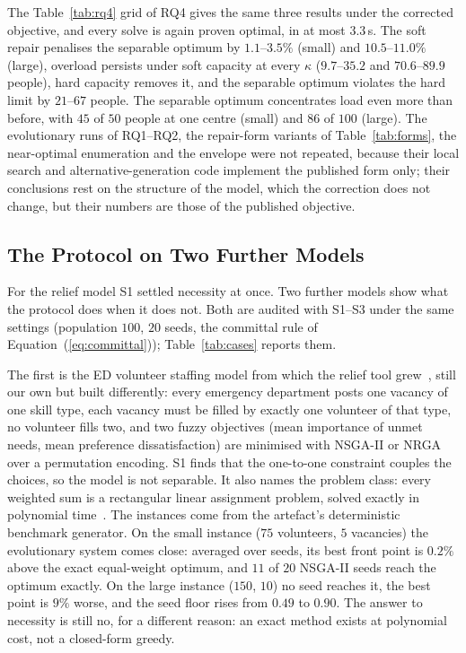 \documentclass[systems,article,accept,moreauthors,pdftex]{Definitions/mdpi}
\begin{document}
The Table~\ref{tab:rq4} grid of RQ4 gives the same three results under the corrected objective,
and every solve is again proven optimal, in at most $3.3$\,s. The soft repair penalises the separable optimum by $1.1$--$3.5\%$ (small) and
$10.5$--$11.0\%$ (large), overload persists under soft capacity at every $\kappa$ ($9.7$--$35.2$
and $70.6$--$89.9$ people), hard capacity removes it, and the separable optimum violates the hard
limit by $21$--$67$ people. The separable optimum concentrates load even more than before, with
$45$ of $50$ people at one centre (small) and $86$ of $100$ (large). The evolutionary runs of
RQ1--RQ2, the repair-form variants of Table~\ref{tab:forms}, the near-optimal enumeration and the envelope were not repeated, because their local
search and alternative-generation code implement the published form only; their conclusions
rest on the structure of the model, which the correction does not change, but their numbers are
those of the published objective.

\subsection{The Protocol on Two Further Models}\label{sec:cases}
For the relief model S1 settled necessity at once. Two further models show what the protocol
does when it does not. Both are audited with S1--S3 under the same settings (population $100$,
$20$ seeds, the committal rule of Equation~(\ref{eq:committal})); Table~\ref{tab:cases} reports them.

The first is the ED volunteer staffing model from which the relief tool
grew~\cite{rabiei2023volunteer}, still our own but built differently: every emergency department
posts one vacancy of one skill type, each vacancy must be filled by exactly one volunteer of that
type, no volunteer fills two, and two fuzzy objectives (mean importance of unmet needs, mean
preference dissatisfaction) are minimised with NSGA-II or NRGA over a permutation encoding. S1
finds that the one-to-one constraint couples the choices, so the model is not separable. It also
names the problem class: every weighted sum is a rectangular linear assignment problem, solved
exactly in polynomial time~\cite{kuhn1955hungarian}. The instances come from the artefact's
deterministic benchmark generator. On the small instance ($75$ volunteers,
$5$ vacancies) the evolutionary system comes close: averaged over seeds, its best front point is
$0.2\%$ above the exact equal-weight optimum, and $11$ of $20$ NSGA-II seeds reach the optimum
exactly. On the large instance
($150$, $10$) no seed reaches it, the best point is $9\%$ worse, and the seed floor rises from
$0.49$ to $0.90$. The answer to necessity is still no, for a different reason: an exact method
exists at polynomial cost, not a closed-form greedy.
\end{document}
